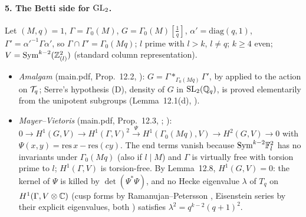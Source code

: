 \paragraph{5. The Betti side for $\mathrm{GL}_2$.} Let $(M,q)=1$, $\Gamma=\Gamma_0(M)$, $G=\Gamma_0(M)[\frac1q]$, $\alpha'=\mathrm{diag}(q,1)$,
$\Gamma'=\alpha'^{-1}\Gamma\alpha'$, so $\Gamma\cap\Gamma'=\Gamma_0(Mq)$; $l$ prime with $l>k$, $l\ne q$; $k\ge4$ even; $V=\mathrm{Sym}^{k-2}(\mathbb{Z}_{(l)}^2)$ (standard column
representation).
\begin{itemize}
\item \emph{Amalgam} (main.pdf, Prop.~12.2, \stpmc): $G=\Gamma*_{\Gamma_0(Mq)}\Gamma'$, by \cite[II.1.4 Thm~3, p.~79]{Se} \stcited{} applied to the action on $\mathcal{T}_q$;
  Serre's hypothesis (D), density of $G$ in $\mathrm{SL}_2(\mathbb{Q}_q)$, is proved elementarily from the unipotent subgroups (Lemma~12.1(d), \stproved).
\item \emph{Mayer--Vietoris} (main.pdf, Prop.~12.3, \stpmc; \cite[III.6 Exercise, p.~74]{Br} \stcited): $0\to H^1(G,V)\to H^1(\Gamma,V)^2\xrightarrow\Psi H^1(\Gamma_0(Mq),V)\to H^2(G,V)\to0$
  with $\Psi(x,y)=\mathrm{res}\,x-\mathrm{res}(cy)$. The end terms vanish because $\mathrm{Sym}^{k-2}\mathbb{F}_l^2$ has no invariants under $\Gamma_0(Mq)$ (also if $l\mid M$) and
  $\Gamma$ is virtually free with torsion prime to $l$; $H^1(\Gamma,V)$ is torsion-free. By Lemma~12.8, $H^1(G,V)=0$: the kernel of $\Psi$ is killed by
  $\det(\Psi^*\Psi)$, and no Hecke eigenvalue $\lambda$ of $T_q$ on $H^1(\Gamma,V\otimes\mathbb{C})$ (cusp forms by Ramanujan--Petersson \cite[Thm.~8.2]{De74}, Eisenstein series
  by their explicit eigenvalues, both \stcited) satisfies $\lambda^2=q^{k-2}(q+1)^2$. \stpmc
\end{itemize}

